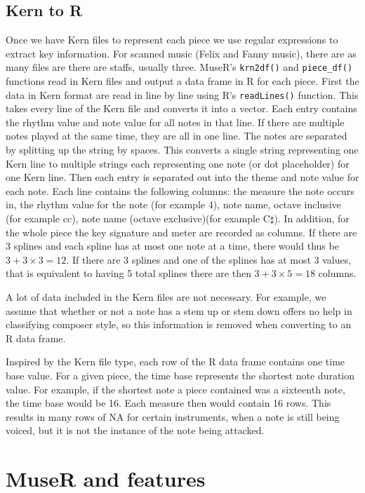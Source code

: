 \documentclass[12pt,twoside]{reedthesis}
\theoremstyle{definition}
\theoremstyle{definition}
\theoremstyle{definition}
\theoremstyle{remark}
\begin{document}
\section{Kern to R}\label{kern-to-r}

Once we have Kern files to represent each piece we use regular
expressions to extract key information. For scanned music (Felix and
Fanny music), there are as many files are there are staffs, usually
three. MuseR's \texttt{krn2df()} and \texttt{piece\_df()} functions read
in Kern files and output a data frame in R for each piece. First the
data in Kern format are read in line by line using R's
\texttt{readLines()} function. This takes every line of the Kern file
and converts it into a vector. Each entry contains the rhythm value and
note value for all notes in that line. If there are multiple notes
played at the same time, they are all in one line. The notes are
separated by splitting up the string by spaces. This converts a single
string representing one Kern line to multiple strings each representing
one note (or dot placeholder) for one Kern line. Then each entry is
separated out into the theme and note value for each note. Each line
contains the following columns: the measure the note occurs in, the
rhythm value for the note (for example 4), note name, octave inclusive
(for example cc), note name (octave exclusive)(for example C\(\sharp\)).
In addition, for the whole piece the key signature and meter are
recorded as columns. If there are 3 splines and each spline has at most
one note at a time, there would thus be \(3 + 3\times3=12\). If there
are 3 splines and one of the splines has at most 3 values, that is
equivalent to having 5 total splines there are then \(3+3\times5 = 18\)
columns.

A lot of data included in the Kern files are not necessary. For example,
we assume that whether or not a note has a stem up or stem down offers
no help in classifying composer style, so this information is removed
when converting to an R data frame.

Inspired by the Kern file type, each row of the R data frame contains
one time base value. For a given piece, the time base represents the
shortest note duration value. For example, if the shortest note a piece
contained was a sixteenth note, the time base would be 16. Each measure
then would contain 16 rows. This results in many rows of NA for certain
instruments, when a note is still being voiced, but it is not the
instance of the note being attacked.

\chapter{MuseR and features}\label{muser-and-features}
\end{document}
